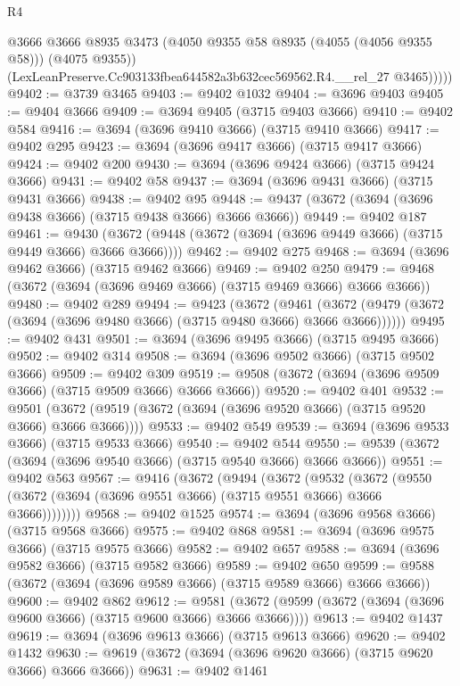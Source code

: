 \begin{lexlean}{R4}
\begin{coremodule}
              @3666
              @3666
              @8935
              @3473
              (@4050 @9355 @58 @8935 (@4055 (@4056 @9355 @58)))
              (@4075 @9355))
            (LexLeanPreserve.Cc903133fbea644582a3b632cec569562.R4.__rel_27 @3465)))))
@9402 := @3739 @3465
@9403 := @9402 @1032
@9404 := @3696 @9403
@9405 := @9404 @3666
@9409 := @3694 @9405 (@3715 @9403 @3666)
@9410 := @9402 @584
@9416 := @3694 (@3696 @9410 @3666) (@3715 @9410 @3666)
@9417 := @9402 @295
@9423 := @3694 (@3696 @9417 @3666) (@3715 @9417 @3666)
@9424 := @9402 @200
@9430 := @3694 (@3696 @9424 @3666) (@3715 @9424 @3666)
@9431 := @9402 @58
@9437 := @3694 (@3696 @9431 @3666) (@3715 @9431 @3666)
@9438 := @9402 @95
@9448 := @9437 (@3672 (@3694 (@3696 @9438 @3666) (@3715 @9438 @3666) @3666 @3666))
@9449 := @9402 @187
@9461 := @9430 (@3672 (@9448 (@3672 (@3694 (@3696 @9449 @3666) (@3715 @9449 @3666) @3666 @3666))))
@9462 := @9402 @275
@9468 := @3694 (@3696 @9462 @3666) (@3715 @9462 @3666)
@9469 := @9402 @250
@9479 := @9468 (@3672 (@3694 (@3696 @9469 @3666) (@3715 @9469 @3666) @3666 @3666))
@9480 := @9402 @289
@9494 := @9423
    (@3672
      (@9461 (@3672 (@9479 (@3672 (@3694 (@3696 @9480 @3666) (@3715 @9480 @3666) @3666 @3666))))))
@9495 := @9402 @431
@9501 := @3694 (@3696 @9495 @3666) (@3715 @9495 @3666)
@9502 := @9402 @314
@9508 := @3694 (@3696 @9502 @3666) (@3715 @9502 @3666)
@9509 := @9402 @309
@9519 := @9508 (@3672 (@3694 (@3696 @9509 @3666) (@3715 @9509 @3666) @3666 @3666))
@9520 := @9402 @401
@9532 := @9501 (@3672 (@9519 (@3672 (@3694 (@3696 @9520 @3666) (@3715 @9520 @3666) @3666 @3666))))
@9533 := @9402 @549
@9539 := @3694 (@3696 @9533 @3666) (@3715 @9533 @3666)
@9540 := @9402 @544
@9550 := @9539 (@3672 (@3694 (@3696 @9540 @3666) (@3715 @9540 @3666) @3666 @3666))
@9551 := @9402 @563
@9567 := @9416
    (@3672
      (@9494
        (@3672
          (@9532
            (@3672 (@9550 (@3672 (@3694 (@3696 @9551 @3666) (@3715 @9551 @3666) @3666 @3666))))))))
@9568 := @9402 @1525
@9574 := @3694 (@3696 @9568 @3666) (@3715 @9568 @3666)
@9575 := @9402 @868
@9581 := @3694 (@3696 @9575 @3666) (@3715 @9575 @3666)
@9582 := @9402 @657
@9588 := @3694 (@3696 @9582 @3666) (@3715 @9582 @3666)
@9589 := @9402 @650
@9599 := @9588 (@3672 (@3694 (@3696 @9589 @3666) (@3715 @9589 @3666) @3666 @3666))
@9600 := @9402 @862
@9612 := @9581 (@3672 (@9599 (@3672 (@3694 (@3696 @9600 @3666) (@3715 @9600 @3666) @3666 @3666))))
@9613 := @9402 @1437
@9619 := @3694 (@3696 @9613 @3666) (@3715 @9613 @3666)
@9620 := @9402 @1432
@9630 := @9619 (@3672 (@3694 (@3696 @9620 @3666) (@3715 @9620 @3666) @3666 @3666))
@9631 := @9402 @1461

\end{coremodule}
\end{lexlean}
